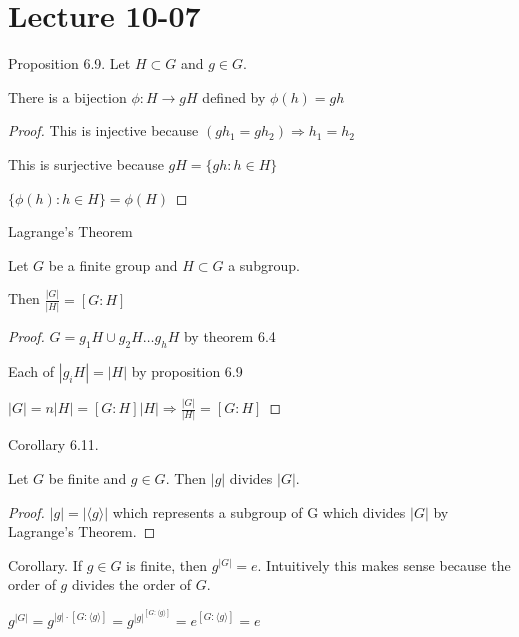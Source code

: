 \documentclass[11pt]{scrartcl}
\begin{document}
\section{Lecture 10-07}


\begin{theorem}
  Proposition 6.9. Let $H \subset G$ and  $g \in G$.

  There is a bijection $\phi :H\to gH$ defined by $\phi(h) = gh$ 
  \begin{proof}
    This is injective because $(gh_1 = gh_2) \Rightarrow h_1 = h_2$ 

    This is surjective because $gH = \{gh: h \in H\}$ 

    $\{\phi(h): h \in H\} = \phi(H)$
  \end{proof}
\end{theorem}

\begin{theorem}
  Lagrange's Theorem

  Let $G$ be a finite group and $H \subset G$ a subgroup.

  Then $\frac{|G|}{|H|} = \left[G:H\right]$


  \begin{proof}
    $G = g_1H \cup g_2H \dots g_hH$ by theorem 6.4

    Each of $|g_iH| = |H|$ by proposition 6.9

    $|G| = n|H| = \left[G:H\right]|H| \Rightarrow \frac{|G|}{|H|} = \left[G:H\right]$ 
  \end{proof}
\end{theorem}

\begin{theorem}
  Corollary 6.11.

  Let $G$ be finite and $g \in G$. Then $|g|$ divides $|G|$.

  \begin{proof}
    $|g| = |\langle g \rangle|$ which represents a subgroup of G which divides  $|G|$ by Lagrange's Theorem.
  \end{proof}
\end{theorem}

\begin{theorem}
  Corollary. If $g \in G$ is finite, then $g^{|G|} = e$. Intuitively this makes sense because the order of $g$ divides the order of $G$.

  $g^{|G|} = g^{|g| \cdot \left[G:\langle g \rangle \right]} = g^{|g|^{\left[G:\langle g \rangle \right]}} = e^{\left[G:\langle g \rangle \right]} = e$
\end{theorem}
\end{document}
